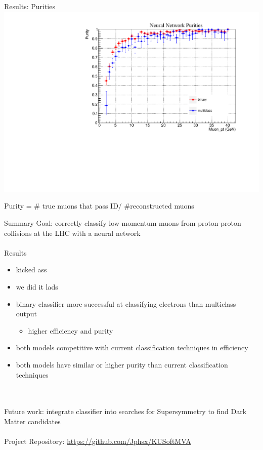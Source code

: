 \documentclass[10pt,handout]{beamer}
\begin{document}
\begin{frame}{Results: Purities}
\centering
\includegraphics[scale=.5]{NN_purities.pdf}

Purity = \# true muons that pass ID/ \#reconstructed muons
\end{frame}


\begin{frame}{Summary}
Goal: correctly classify low momentum muons from proton-proton collisions at the LHC with a neural network
\quad \\
\quad \\
Results
\begin{itemize}
\item kicked ass
\item we did it lads
\item binary classifier more successful at classifying electrons than multiclass output
\begin{itemize}
\item higher efficiency and purity
\end{itemize}
\item both models competitive with current classification techniques in efficiency
\item both models have similar or higher purity than current classification techniques
\end{itemize}
\quad \\
\quad \\
Future work: integrate classifier into searches for Supersymmetry to find Dark Matter candidates
\quad \\
\quad \\
Project Repository: \url{https://github.com/Jphsx/KUSoftMVA}
\end{frame}
\end{document}
